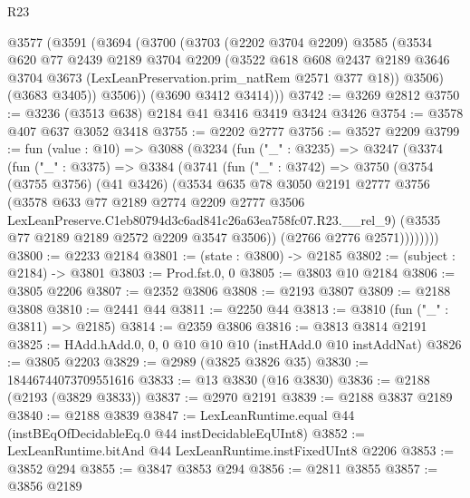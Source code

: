 \begin{lexlean}{R23}
\begin{coremodule}
    @3577
      (@3591
        (@3694
          (@3700
            (@3703
              (@2202 @3704 @2209)
              @3585
              (@3534
                @620
                @77
                @2439
                @2189
                @3704
                @2209
                (@3522
                  @618
                  @608
                  @2437
                  @2189
                  @3646
                  @3704
                  @3673
                  (LexLeanPreservation.prim_natRem @2571 @377 @18))
                @3506)
              (@3683 @3405))
            @3506))
        (@3690 @3412 @3414)))
@3742 := @3269 @2812
@3750 := @3236 (@3513 @638) @2184 @41 @3416 @3419 @3424 @3426
@3754 := @3578 @407 @637 @3052 @3418
@3755 := @2202 @2777
@3756 := @3527 @2209
@3799 := fun (value : @10) =>
  @3088
    (@3234
      (fun ("_" : @3235) =>
      @3247
        (@3374
          (fun ("_" : @3375) =>
          @3384
            (@3741
              (fun ("_" : @3742) =>
              @3750
                (@3754
                  (@3755 @3756)
                  (@41 @3426)
                  (@3534
                    @635
                    @78
                    @3050
                    @2191
                    @2777
                    @3756
                    (@3578
                      @633
                      @77
                      @2189
                      @2774
                      @2209
                      @2777
                      @3506
                      LexLeanPreserve.C1eb80794d3c6ad841c26a63ea758fc07.R23.__rel_9)
                    (@3535 @77 @2189 @2189 @2572 @2209 @3547 @3506))
                  (@2766 @2776 @2571))))))))
@3800 := @2233 @2184
@3801 := (state : @3800) -> @2185
@3802 := (subject : @2184) -> @3801
@3803 := Prod.fst.{0, 0}
@3805 := @3803 @10 @2184
@3806 := @3805 @2206
@3807 := @2352 @3806
@3808 := @2193 @3807
@3809 := @2188 @3808
@3810 := @2441 @44
@3811 := @2250 @44
@3813 := @3810 (fun ("_" : @3811) => @2185)
@3814 := @2359 @3806
@3816 := @3813 @3814 @2191
@3825 := HAdd.hAdd.{0, 0, 0} @10 @10 @10 (instHAdd.{0} @10 instAddNat)
@3826 := @3805 @2203
@3829 := @2989 (@3825 @3826 @35)
@3830 := 18446744073709551616
@3833 := @13 @3830 (@16 @3830)
@3836 := @2188 (@2193 (@3829 @3833))
@3837 := @2970 @2191
@3839 := @2188 @3837 @2189
@3840 := @2188 @3839
@3847 := LexLeanRuntime.equal @44 (instBEqOfDecidableEq.{0} @44 instDecidableEqUInt8)
@3852 := LexLeanRuntime.bitAnd @44 LexLeanRuntime.instFixedUInt8 @2206
@3853 := @3852 @294
@3855 := @3847 @3853 @294
@3856 := @2811 @3855
@3857 := @3856 @2189

\end{coremodule}
\end{lexlean}
